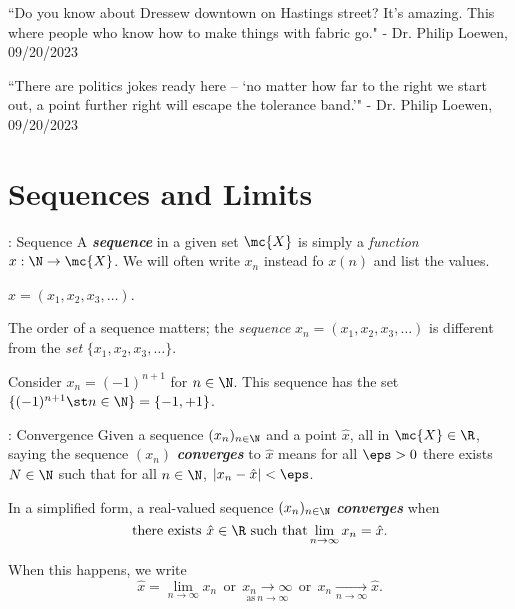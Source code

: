\begin{nquote}{}
	``Do you know about Dressew downtown on Hastings street? It's amazing. This where people who know how to make things with fabric go." - Dr. Philip Loewen, 09/20/2023
	
	\medskip
	
	``There are politics jokes ready here -- `no matter how far to the right we start out, a point further right will escape the tolerance band.'" - Dr. Philip Loewen, 09/20/2023
\end{nquote}

\section{Sequences and Limits}
\begin{ndef}{: Sequence}
	A \emph{\textbf{sequence}} in a given set \(\mc{X}\) is simply a \textit{function} \(x:\N\to \mc{X}\). We will often write \(x_n\) instead fo \(x(n)\) and list the values. 
	\begin{example}
		\(x=(x_1,x_2,x_3,\dots)\).
	\end{example}
\end{ndef}
The order of a sequence matters; the \textit{sequence} \(x_n=(x_1,x_2,x_3,\dots)\) is different from the \emph{set} \(\{x_1,x_2,x_3,\dots\}\).
\begin{example}
	Consider \(x_n=(-1)^{n+1}\) for \(n\in\N\). This sequence has the set \(\{(-1)^{n+1}\st n\in\N\}=\{-1,+1\}\).
\end{example}
\begin{ndef}{: Convergence}
	Given a sequence \((x_n)_{n\in\N}\) and a point \(\hat{x}\), all in \(\mc{X}\in\R\), saying the sequence \((x_n)\) \emph{\textbf{converges}} to \(\hat{x}\) means for all \(\eps>0\) there exists \(N\in\N\) such that for all \(n\in\N\), \(|x_n-\hat{x}|<\eps\).
	
	\medskip
	
	In a simplified form, a real-valued sequence \((x_n)_{n\in\N}\) \emph{\textbf{converges}} when 
	\begin{equation*}
		\text{there exists}~\hat{x}\in\R~\text{such that}\lim_{n\to\infty}x_n=\hat{x}.
	\end{equation*}
\end{ndef}
\begin{notation}
	When this happens, we write 
	\begin{equation*}
		\hat{x}=\lim_{n\to\infty}x_n~~\text{or}~~\underset{\text{as}~n\to\infty}{x_n\to\infty}~~\text{or}~~x_n\xrightarrow[n\to\infty]{}\hat{x}.
	\end{equation*}
\end{notation}

